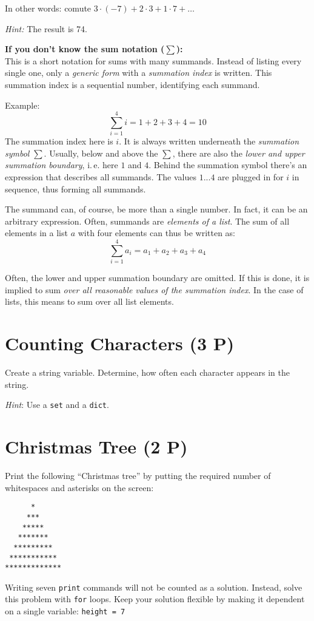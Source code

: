 \documentclass[
	ngerman,
	fontsize=10pt,
	parskip=half,
	titlepage=true,
	DIV=12
]{scrartcl}
\newcommand*{\inPy}[1]{\texttt{#1}}
\newcommand*{\ie}{i.\,e. }
\begin{document}
In other words: comute $3 \cdot (-7) + 2 \cdot 3 + 1 \cdot 7 + \ldots$

\emph{Hint:} The result is 74.

\textbf{If you don't know the sum notation ($\sum$):}\\
This is a short notation for sums with many summands. Instead of listing every single one, only a \emph{generic form} with a \emph{summation index} is written. This summation index is a sequential number, identifying each summand.

Example:
\[\sum_{i=1}^4 i = 1 + 2 + 3 + 4 = 10 \]
The summation index here is $i$. It is always written underneath the \emph{summation symbol} $\sum$. Usually, below and above the $\sum$, there are also the \emph{lower and upper summation boundary}, \ie here $1$ and $4$. Behind the summation symbol there's an expression that describes all summands. The values $1 ... 4$ are plugged in for $i$ in sequence, thus forming all summands.

The summand can, of course, be more than a single number. In fact, it can be an arbitrary expression. Often, summands are \emph{elements of a list}. The sum of all elements in a list $a$ with four elements can thus be written as:
\[ \sum_{i=1}^4 a_i = a_1 + a_2 + a_3 + a_4 \]

Often, the lower and upper summation boundary are omitted. If this is done, it is implied to sum \emph{over all reasonable values of the summation index}. In the case of lists, this means to sum over all list elements.


\section{Counting Characters (3 P)}
Create a string variable. Determine, how often each character appears in the string.

\emph{Hint}: Use a \inPy{set} and a \inPy{dict}.


\section{Christmas Tree (2 P)}
Print the following \enquote{Christmas tree} by putting the required number of whitespaces and asterisks on the screen:
\begin{verbatim}
      *
     ***
    *****
   *******
  *********
 ***********
*************
\end{verbatim}

Writing seven \inPy{print} commands will not be counted as a solution. Instead, solve this problem with \inPy{for} loops. Keep your solution flexible by making it dependent on a single variable:
\texttt{height = 7}
\end{document}
